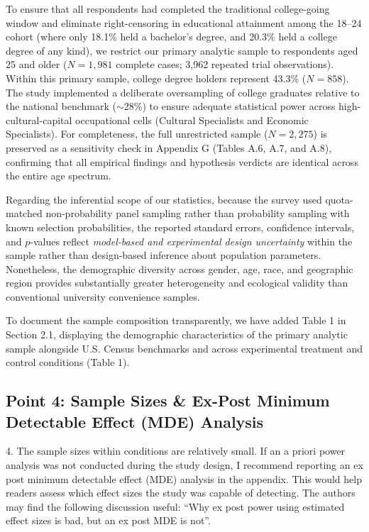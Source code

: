 \documentclass[11pt, letterpaper]{article}
\begin{document}
To ensure that all respondents had completed the traditional college-going window and eliminate right-censoring in educational attainment among the 18--24 cohort (where only 18.1\% held a bachelor's degree, and 20.3\% held a college degree of any kind), we restrict our primary analytic sample to respondents aged 25 and older ($N = 1,981$ complete cases; 3,962 repeated trial observations). Within this primary sample, college degree holders represent 43.3\% ($N = 858$). The study implemented a deliberate oversampling of college graduates relative to the national benchmark ($\sim 28\%$) to ensure adequate statistical power across high-cultural-capital occupational cells (Cultural Specialists and Economic Specialists). For completeness, the full unrestricted sample ($N = 2,275$) is preserved as a sensitivity check in Appendix G (Tables A.6, A.7, and A.8), confirming that all empirical findings and hypothesis verdicts are identical across the entire age spectrum.

Regarding the inferential scope of our statistics, because the survey used quota-matched non-probability panel sampling rather than probability sampling with known selection probabilities, the reported standard errors, confidence intervals, and $p$-values reflect \textit{model-based and experimental design uncertainty} within the sample rather than design-based inference about population parameters. Nonetheless, the demographic diversity across gender, age, race, and geographic region provides substantially greater heterogeneity and ecological validity than conventional university convenience samples.

To document the sample composition transparently, we have added Table 1 in Section 2.1, displaying the demographic characteristics of the primary analytic sample alongside U.S. Census benchmarks and across experimental treatment and control conditions (Table 1).

\subsection*{Point 4: Sample Sizes \& Ex-Post Minimum Detectable Effect (MDE) Analysis}

\begin{reviewercomment}
4. The sample sizes within conditions are relatively small. If an a priori power analysis was not conducted during the study design, I recommend reporting an ex post minimum detectable effect (MDE) analysis in the appendix. This would help readers assess which effect sizes the study was capable of detecting. The authors may find the following discussion useful: ``Why ex post power using estimated effect sizes is bad, but an ex post MDE is not''.
\end{reviewercomment}
\end{document}
